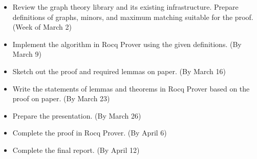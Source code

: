 \documentclass[acmsmall, screen, nonacm]{acmart}
\begin{document}
\begin{itemize}
	\item Review the graph theory library and its existing infrastructure. Prepare definitions of graphs, minors, and maximum matching suitable for the proof. (Week of March 2)
	\item Implement the algorithm in Rocq Prover using the given definitions. (By March 9)
	\item Sketch out the proof and required lemmas on paper. (By March 16)
	\item Write the statements of lemmas and theorems in Rocq Prover based on the proof on paper. (By March 23)
	\item Prepare the presentation. (By March 26)
	\item Complete the proof in Rocq Prover. (By April 6)
	\item Complete the final report. (By April 12)
\end{itemize}


{}
\end{document}
